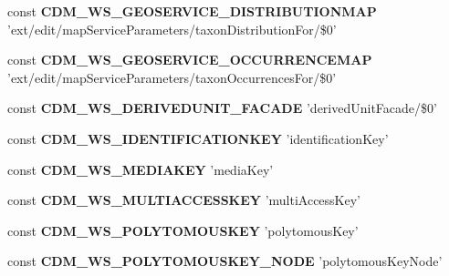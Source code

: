 \begin{DoxyCompactItemize}
\item 
\hypertarget{webservice__uris_8php_afffeec4d6fdd5a57abd95f8a34019ab8}{const {\bfseries C\-D\-M\-\_\-\-W\-S\-\_\-\-G\-E\-O\-S\-E\-R\-V\-I\-C\-E\-\_\-\-D\-I\-S\-T\-R\-I\-B\-U\-T\-I\-O\-N\-M\-A\-P} 'ext/edit/map\-Service\-Parameters/taxon\-Distribution\-For/\$0'}\label{webservice__uris_8php_afffeec4d6fdd5a57abd95f8a34019ab8}

\item 
\hypertarget{webservice__uris_8php_af601ef14965bb43fd7a1c78840a553ac}{const {\bfseries C\-D\-M\-\_\-\-W\-S\-\_\-\-G\-E\-O\-S\-E\-R\-V\-I\-C\-E\-\_\-\-O\-C\-C\-U\-R\-R\-E\-N\-C\-E\-M\-A\-P} 'ext/edit/map\-Service\-Parameters/taxon\-Occurrences\-For/\$0'}\label{webservice__uris_8php_af601ef14965bb43fd7a1c78840a553ac}

\item 
\hypertarget{webservice__uris_8php_adcaeefc6c4b43ea1673ebaedbfe8f781}{const {\bfseries C\-D\-M\-\_\-\-W\-S\-\_\-\-D\-E\-R\-I\-V\-E\-D\-U\-N\-I\-T\-\_\-\-F\-A\-C\-A\-D\-E} 'derived\-Unit\-Facade/\$0'}\label{webservice__uris_8php_adcaeefc6c4b43ea1673ebaedbfe8f781}

\item 
\hypertarget{webservice__uris_8php_a2995fa4f37ab95f1b3ee4b4c109b6437}{const {\bfseries C\-D\-M\-\_\-\-W\-S\-\_\-\-I\-D\-E\-N\-T\-I\-F\-I\-C\-A\-T\-I\-O\-N\-K\-E\-Y} 'identification\-Key'}\label{webservice__uris_8php_a2995fa4f37ab95f1b3ee4b4c109b6437}

\item 
\hypertarget{webservice__uris_8php_a0f57e79de88aacc40aa1ea7695ad07fc}{const {\bfseries C\-D\-M\-\_\-\-W\-S\-\_\-\-M\-E\-D\-I\-A\-K\-E\-Y} 'media\-Key'}\label{webservice__uris_8php_a0f57e79de88aacc40aa1ea7695ad07fc}

\item 
\hypertarget{webservice__uris_8php_a84c27e198210bf340b2648c07bf4011d}{const {\bfseries C\-D\-M\-\_\-\-W\-S\-\_\-\-M\-U\-L\-T\-I\-A\-C\-C\-E\-S\-S\-K\-E\-Y} 'multi\-Access\-Key'}\label{webservice__uris_8php_a84c27e198210bf340b2648c07bf4011d}

\item 
\hypertarget{webservice__uris_8php_a0518d0c2b21b7a68c39ae262bab7355a}{const {\bfseries C\-D\-M\-\_\-\-W\-S\-\_\-\-P\-O\-L\-Y\-T\-O\-M\-O\-U\-S\-K\-E\-Y} 'polytomous\-Key'}\label{webservice__uris_8php_a0518d0c2b21b7a68c39ae262bab7355a}

\item 
\hypertarget{webservice__uris_8php_a22b071529433ea36838e9d04f35fa687}{const {\bfseries C\-D\-M\-\_\-\-W\-S\-\_\-\-P\-O\-L\-Y\-T\-O\-M\-O\-U\-S\-K\-E\-Y\-\_\-\-N\-O\-D\-E} 'polytomous\-Key\-Node'}\label{webservice__uris_8php_a22b071529433ea36838e9d04f35fa687}


\end{DoxyCompactItemize}
